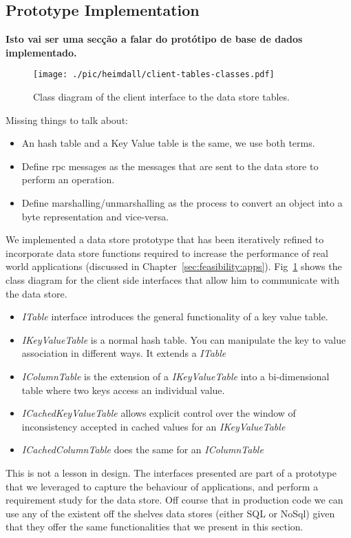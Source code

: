 \subsection{Prototype Implementation}
\textbf{Isto vai ser uma secção a falar do protótipo de base de dados implementado.} 
\begin{figure}[ht]
  \centering
  \texttt{[image: ./pic/heimdall/client-tables-classes.pdf]}
  \caption{Class diagram of the client interface to the data store tables.}
\label{fig:design:class-diagram}
\end{figure}

Missing things to talk about: 
\begin{itemize}
\item An hash table and a Key Value table is the same, we use both terms. 
\item Define \gls{rpc} messages as the messages that are sent to the data store to perform an operation. 
\item Define marshalling/unmarshalling as the process to convert an object into a byte representation and vice-versa. 
\end{itemize}

We implemented a  data store prototype that has been iteratively refined to incorporate data store functions required to increase the performance of real world applications (discussed in Chapter~\ref{sec:feasibility:apps}).  
Fig~\ref{fig:design:class-diagram} shows the class diagram for the client side interfaces that allow him to communicate with the  data store.  
\begin{itemize}
\item \emph{ITable} interface introduces the general functionality of a key value table.
\item \emph{IKeyValueTable}  is a normal hash table. You can manipulate the key to value association in different ways. It extends a \emph{ITable}
\item \emph{IColumnTable} is the extension of a \emph{IKeyValueTable} into a bi-dimensional table where two keys access an individual value. 
\item \emph{ICachedKeyValueTable} allows explicit control over the window of inconsistency accepted in cached values for an \emph{IKeyValueTable} 
\item \emph{ICachedColumnTable} does the same for an \emph{IColumnTable} 
\end{itemize}

This is not a lesson in design. The interfaces presented are part of a prototype that we leveraged to capture the behaviour of applications, and perform a requirement study for the data store. Off course that in production code we can use any of the existent off the shelves data stores (either SQL or NoSql) given that they offer the same functionalities that we present in this section. 
\label{sec:heimdall:key-value}

